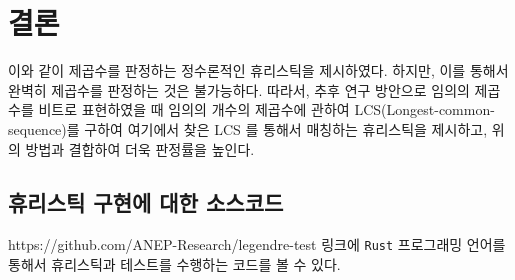 \documentclass[a4paper]{article}
\begin{document}
    \section{결론}
        이와 같이 제곱수를 판정하는 정수론적인 휴리스틱을 제시하였다.
        하지만, 이를 통해서 완벽히 제곱수를 판정하는 것은 불가능하다.
        따라서, 추후 연구 방안으로 임의의 제곱수를 비트로 표현하였을 때 임의의 개수의 제곱수에 관하여 LCS(Longest-common-sequence)를 구하여 여기에서 찾은 LCS 를 통해서 매칭하는 휴리스틱을 제시하고, 위의 방법과 결합하여 더욱 판정률을 높인다.
    \newpage
    \begin{appendices}
        \section{휴리스틱 구현에 대한 소스코드}
            https://github.com/ANEP-Research/legendre-test 링크에 \texttt{Rust} 프로그래밍 언어를 통해서 휴리스틱과 테스트를 수행하는 코드를 볼 수 있다.
    \end{appendices}
    
    
\end{document}
